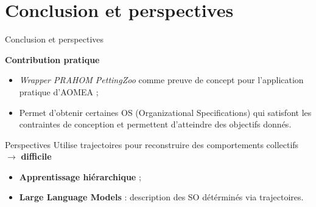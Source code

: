 \section{Conclusion et perspectives}
\begin{frame}{Conclusion et perspectives}
    {}

    \begin{prosblock}{\textbf{Contribution pratique}}

        \begin{itemize}
            \item \emph{Wrapper PRAHOM PettingZoo} comme preuve de concept pour l'application pratique d'AOMEA ;
            \item Permet d'obtenir certaines OS (Organizational Specifications) qui satisfont les contraintes de conception et permettent d'atteindre des objectifs donnés.
        \end{itemize}

    \end{prosblock}

    \begin{alertblock}{Perspectives}
        Utilise trajectoires pour reconstruire des comportements collectifs $\rightarrow$ \textbf{difficile}
        \begin{itemize}
            \item \textbf{Apprentissage hiérarchique} ;
            \item \textbf{Large Language Models} : description des SO détérminés via trajectoires.
        \end{itemize}
    \end{alertblock}

\end{frame}
